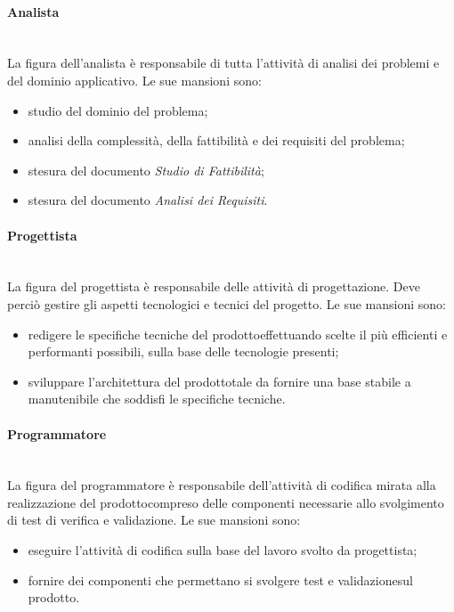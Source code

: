 			\paragraph*{Analista}\mbox{}\\ [1mm]
				La figura dell'analista è responsabile di tutta l'attività di analisi dei problemi e del dominio applicativo.
				Le sue mansioni sono:
				\begin{itemize}
					\item studio del dominio del problema;
					\item analisi della complessità, della fattibilità e dei requisiti del problema;
					\item stesura del documento \textit{Studio di Fattibilità};
					\item stesura del documento \textit{Analisi dei Requisiti}.
				\end{itemize}
			\paragraph*{Progettista}\mbox{}\\ [1mm]
				La figura del progettista è responsabile delle attività di progettazione\glo. Deve perciò gestire gli aspetti tecnologici e tecnici del progetto\glo.
				Le sue mansioni sono:
				\begin{itemize}
					\item redigere le specifiche tecniche del prodotto\glosp effettuando scelte il più efficienti e performanti possibili, sulla base delle tecnologie presenti;
					\item sviluppare l'architettura del prodotto\glosp tale da fornire una base stabile a manutenibile che soddisfi le specifiche tecniche.
				\end{itemize}
			\paragraph*{Programmatore}\mbox{}\\ [1mm]
				La figura del programmatore è responsabile dell'attività di codifica mirata alla realizzazione del prodotto\glosp compreso delle componenti necessarie allo svolgimento di test di verifica e validazione\glo.
				Le sue mansioni sono:
				\begin{itemize}
					\item eseguire l'attività di codifica sulla base del lavoro svolto da progettista;
					\item fornire dei componenti che permettano si svolgere test e validazione\glosp sul prodotto\glo.
				\end{itemize}
